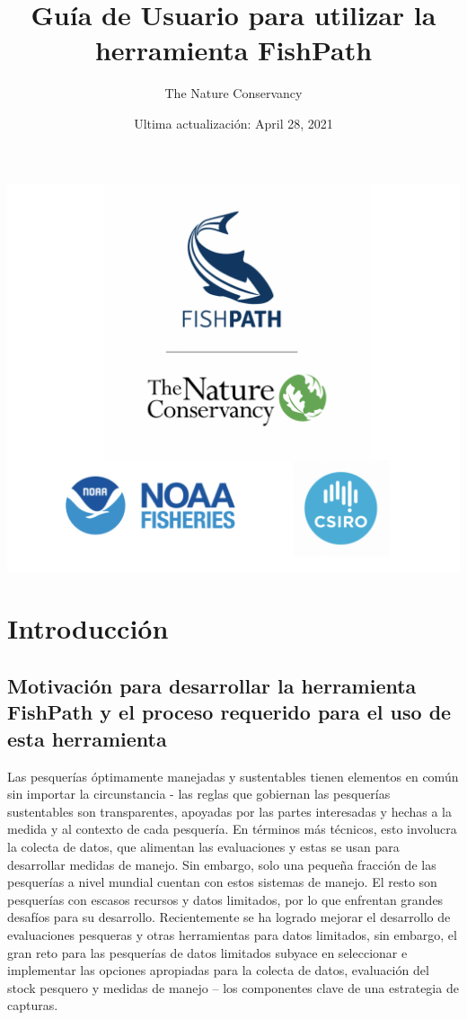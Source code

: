 \documentclass[
  11pt,
]{book}
\title{Guía de Usuario para utilizar la herramienta FishPath}
\author{The Nature Conservancy}
\date{Ultima actualización: April 28, 2021}
\begin{document}
\maketitle

{
\setcounter{tocdepth}{1}
\tableofcontents
}
\hypertarget{section}{%
\chapter*{}\label{section}}

\begin{center}\includegraphics[width=0.75\linewidth]{images/3-logos} \end{center}

\hypertarget{intro}{%
\chapter{Introducción}\label{intro}}

\hypertarget{motivation}{%
\section{Motivación para desarrollar la herramienta FishPath y el proceso requerido para el uso de esta herramienta}\label{motivation}}

Las pesquerías óptimamente manejadas y sustentables tienen elementos en común sin importar la circunstancia - las reglas que gobiernan las pesquerías sustentables son transparentes, apoyadas por las partes interesadas y hechas a la medida y al contexto de cada pesquería. En términos más técnicos, esto involucra la colecta de datos, que alimentan las evaluaciones y estas se usan para desarrollar medidas de manejo. Sin embargo, solo una pequeña fracción de las pesquerías a nivel mundial cuentan con estos sistemas de manejo. El resto son pesquerías con escasos recursos y datos limitados, por lo que enfrentan grandes desafíos para su desarrollo. Recientemente se ha logrado mejorar el desarrollo de evaluaciones pesqueras y otras herramientas para datos limitados, sin embargo, el gran reto para las pesquerías de datos limitados subyace en seleccionar e implementar las opciones apropiadas para la colecta de datos, evaluación del stock pesquero y medidas de manejo -- los componentes clave de una estrategia de capturas.
\end{document}
